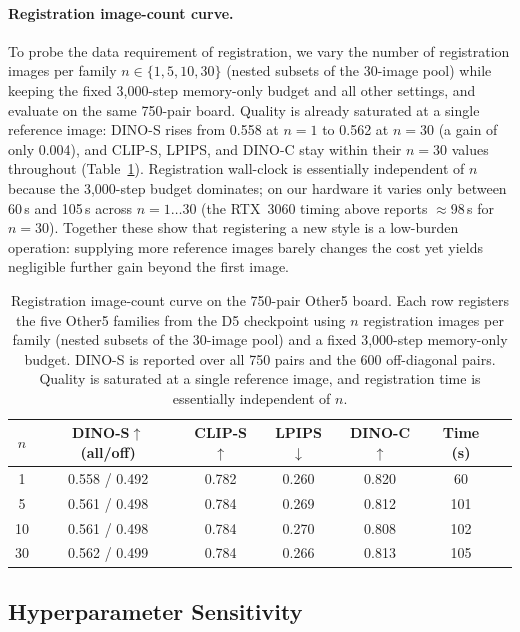 \documentclass[letterpaper]{article}
\begin{document}
\paragraph{Registration image-count curve.}
To probe the data requirement of registration, we vary the number of registration images
per family $n\in\{1,5,10,30\}$ (nested subsets of the 30-image pool) while keeping the fixed
3{,}000-step memory-only budget and all other settings, and evaluate on the same 750-pair board.
Quality is already saturated at a single reference image: DINO-S rises from 0.558 at $n{=}1$
to 0.562 at $n{=}30$ (a gain of only 0.004), and CLIP-S, LPIPS, and DINO-C stay within their
$n{=}30$ values throughout (Table~\ref{tab:supp-register-imgcount}). Registration wall-clock is
essentially independent of $n$ because the 3{,}000-step budget dominates; on our hardware it
varies only between 60\,s and 105\,s across $n{=}1\ldots30$ (the RTX~3060 timing above reports
$\approx$98\,s for $n{=}30$). Together these show that registering a new style is a low-burden
operation: supplying more reference images barely changes the cost yet yields negligible further
gain beyond the first image.

\begin{table}[t]
\centering
\small
\setlength{\tabcolsep}{4pt}
\begin{tabular}{@{}ccccccc@{}}
\toprule
$n$ & DINO-S$\uparrow$ (all/off) & CLIP-S$\uparrow$ & LPIPS$\downarrow$ & DINO-C$\uparrow$ & Time (s) \\
\midrule
1  & 0.558 / 0.492 & 0.782 & 0.260 & 0.820 & 60  \\
5  & 0.561 / 0.498 & 0.784 & 0.269 & 0.812 & 101 \\
10 & 0.561 / 0.498 & 0.784 & 0.270 & 0.808 & 102 \\
30 & 0.562 / 0.499 & 0.784 & 0.266 & 0.813 & 105 \\
\bottomrule
\end{tabular}
\caption{Registration image-count curve on the 750-pair Other5 board. Each row registers the five
Other5 families from the D5 checkpoint using $n$ registration images per family (nested subsets of
the 30-image pool) and a fixed 3{,}000-step memory-only budget. DINO-S is reported over all 750
pairs and the 600 off-diagonal pairs. Quality is saturated at a single reference image, and
registration time is essentially independent of $n$.}
\label{tab:supp-register-imgcount}
\end{table}

\subsection{Hyperparameter Sensitivity}
\label{sec:supp-hypersens}
\end{document}
